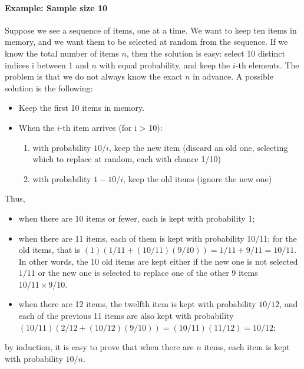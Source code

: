 \paragraph{Example: Sample size 10}
\begin{flushleft}
Suppose we see a sequence of items, one at a time. We want to keep ten items in memory, and we want them to be selected at random from the sequence. If we know the total number of items $ n $, then the solution is easy: select 10 distinct indices i between 1 and $ n $ with equal probability, and keep the $ i $-th elements. The problem is that we do not always know the exact $ n $ in advance. A possible solution is the following:

\begin{itemize}
\item Keep the first 10 items in memory.
\item When the $i$-th item arrives (for i > 10):
\begin{enumerate}
\item with probability $ 10 / i $, keep the new item (discard an old one, selecting which to replace at random, each with chance 1/10)
\item with probability $1 − 10 / i$, keep the old items (ignore the new one)
\end{enumerate}
\end{itemize}
Thus, 
\begin{itemize}
\item when there are 10 items or fewer, each is kept with probability 1;
\item when there are 11 items, each of them is kept with probability 10/11; for the old items, that is $(1)(1/11 + (10/11)(9/10)) = 1/11 + 9/11 = 10/11$. In other words, the 10 old items are kept either if the new one is not selected $ 1/11 $ or the new one is selected to replace one of the other 9 items $10/11 \times 9/10$.
\item when there are 12 items, the twelfth item is kept with probability $ 10/12 $, and each of the previous 11 items are also kept with probability $(10/11)(2/12 + (10/12)(9/10)) = (10/11)(11/12) = 10/12$;
\end{itemize}

by induction, it is easy to prove that when there are $ n $ items, each item is kept with probability $ 10 / n $.
\end{flushleft}


